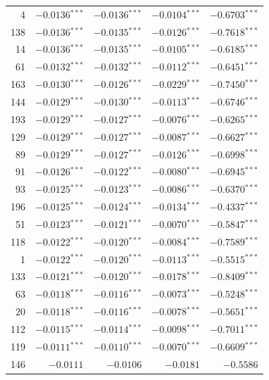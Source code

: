 \documentclass[review,authoryear]{elsarticle}
\begin{document}
\begin{longtable}{rrrrr}
4 & $-0.0136$$^{***}$ & $-0.0136$$^{***}$ & $-0.0104$$^{***}$ & $-0.6703$$^{***}$ \\
138 & $-0.0136$$^{***}$ & $-0.0135$$^{***}$ & $-0.0126$$^{***}$ & $-0.7618$$^{***}$ \\
14 & $-0.0136$$^{***}$ & $-0.0135$$^{***}$ & $-0.0105$$^{***}$ & $-0.6185$$^{***}$ \\
61 & $-0.0132$$^{***}$ & $-0.0132$$^{***}$ & $-0.0112$$^{***}$ & $-0.6451$$^{***}$ \\
163 & $-0.0130$$^{***}$ & $-0.0126$$^{***}$ & $-0.0229$$^{***}$ & $-0.7450$$^{***}$ \\
144 & $-0.0129$$^{***}$ & $-0.0130$$^{***}$ & $-0.0113$$^{***}$ & $-0.6746$$^{***}$ \\
193 & $-0.0129$$^{***}$ & $-0.0127$$^{***}$ & $-0.0076$$^{***}$ & $-0.6265$$^{***}$ \\
129 & $-0.0129$$^{***}$ & $-0.0127$$^{***}$ & $-0.0087$$^{***}$ & $-0.6627$$^{***}$ \\
89 & $-0.0129$$^{***}$ & $-0.0127$$^{***}$ & $-0.0126$$^{***}$ & $-0.6998$$^{***}$ \\
91 & $-0.0126$$^{***}$ & $-0.0122$$^{***}$ & $-0.0080$$^{***}$ & $-0.6945$$^{***}$ \\
93 & $-0.0125$$^{***}$ & $-0.0123$$^{***}$ & $-0.0086$$^{***}$ & $-0.6370$$^{***}$ \\
196 & $-0.0125$$^{***}$ & $-0.0124$$^{***}$ & $-0.0134$$^{***}$ & $-0.4337$$^{***}$ \\
51 & $-0.0123$$^{***}$ & $-0.0121$$^{***}$ & $-0.0070$$^{***}$ & $-0.5847$$^{***}$ \\
118 & $-0.0122$$^{***}$ & $-0.0120$$^{***}$ & $-0.0084$$^{***}$ & $-0.7589$$^{***}$ \\
1 & $-0.0122$$^{***}$ & $-0.0120$$^{***}$ & $-0.0113$$^{***}$ & $-0.5515$$^{***}$ \\
133 & $-0.0121$$^{***}$ & $-0.0120$$^{***}$ & $-0.0178$$^{***}$ & $-0.8409$$^{***}$ \\
63 & $-0.0118$$^{***}$ & $-0.0116$$^{***}$ & $-0.0073$$^{***}$ & $-0.5248$$^{***}$ \\
20 & $-0.0118$$^{***}$ & $-0.0116$$^{***}$ & $-0.0078$$^{***}$ & $-0.5651$$^{***}$ \\
112 & $-0.0115$$^{***}$ & $-0.0114$$^{***}$ & $-0.0098$$^{***}$ & $-0.7011$$^{***}$ \\
119 & $-0.0111$$^{***}$ & $-0.0110$$^{***}$ & $-0.0070$$^{***}$ & $-0.6609$$^{***}$ \\
146 & $-0.0111$ & $-0.0106$ & $-0.0181$ & $-0.5586$ \\

\end{longtable}
\end{document}
